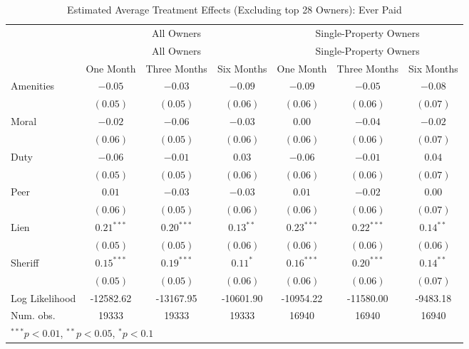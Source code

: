 \documentclass[12pt,titlepage]{article}
\begin{document}
\begin{sidewaystable}[htbp]
\caption{Estimated Average Treatment Effects (Excluding top 28 Owners): Ever Paid}
\begin{center}
\begin{tabular}{|l| c c c| c c c| }
\hline
 & \multicolumn{3}{c}{All Owners} & \multicolumn{3}{|c|}{Single-Property Owners} \\
 & \multicolumn{3}{c}{All Owners} & \multicolumn{3}{|c|}{Single-Property Owners} \\
               & One Month & Three Months & Six Months & One Month & Three Months & Six Months \\
\hline
Amenities      & $-0.05$      & $-0.03$      & $-0.09$     & $-0.09$      & $-0.05$      & $-0.08$     \\
               & $(0.05)$     & $(0.05)$     & $(0.06)$    & $(0.06)$     & $(0.06)$     & $(0.07)$    \\
Moral          & $-0.02$      & $-0.06$      & $-0.03$     & $0.00$       & $-0.04$      & $-0.02$     \\
               & $(0.06)$     & $(0.05)$     & $(0.06)$    & $(0.06)$     & $(0.06)$     & $(0.07)$    \\
Duty           & $-0.06$      & $-0.01$      & $0.03$      & $-0.06$      & $-0.01$      & $0.04$      \\
               & $(0.05)$     & $(0.05)$     & $(0.06)$    & $(0.06)$     & $(0.06)$     & $(0.07)$    \\
Peer           & $0.01$       & $-0.03$      & $-0.03$     & $0.01$       & $-0.02$      & $0.00$      \\
               & $(0.06)$     & $(0.05)$     & $(0.06)$    & $(0.06)$     & $(0.06)$     & $(0.07)$    \\
Lien           & $0.21^{***}$ & $0.20^{***}$ & $0.13^{**}$ & $0.23^{***}$ & $0.22^{***}$ & $0.14^{**}$ \\
               & $(0.05)$     & $(0.05)$     & $(0.06)$    & $(0.06)$     & $(0.06)$     & $(0.06)$    \\
Sheriff        & $0.15^{***}$ & $0.19^{***}$ & $0.11^{*}$  & $0.16^{***}$ & $0.20^{***}$ & $0.14^{**}$ \\
               & $(0.05)$     & $(0.05)$     & $(0.06)$    & $(0.06)$     & $(0.06)$     & $(0.07)$    \\
\hline
Log Likelihood & -12582.62    & -13167.95    & -10601.90   & -10954.22    & -11580.00    & -9483.18    \\
Num. obs.      & 19333        & 19333        & 19333       & 16940        & 16940        & 16940       \\
\hline
\multicolumn{7}{l}{\scriptsize{$^{***}p<0.01$, $^{**}p<0.05$, $^*p<0.1$}}
\end{tabular}
\label{tbl:reg7_ep_x28}
\end{center}
\end{sidewaystable}
\end{document}
